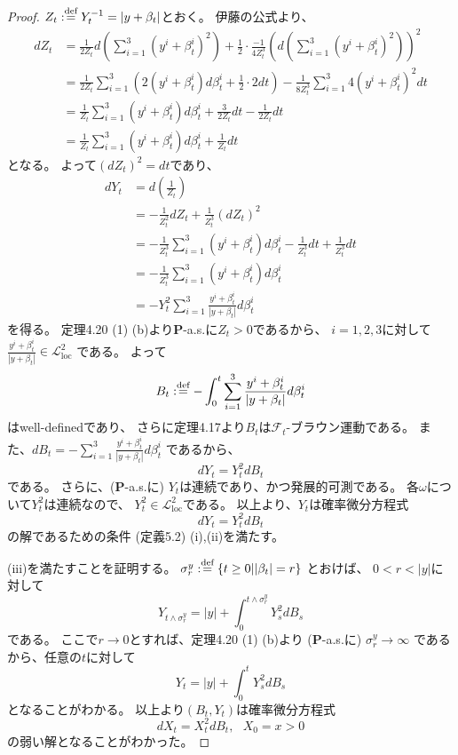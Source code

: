 \documentclass[uplatex]{jsarticle}
\theoremstyle{definition}
\def\P{\mathbf{P}}
\def\mcF{\mathcal{F}}
\def\mcL{\mathcal{L}}
\def\dfn{:\overset{\mbox{{\scriptsize def}}}{=}}
\begin{document}
\begin{proof}
  \(Z_t \dfn Y_t^{-1} = |y + \beta_t|\)とおく。
  伊藤の公式より、
  \begin{align*}
    dZ_t
    &= \frac{1}{2Z_t}d\left( \sum_{i=1}^3(y^i + \beta_t^i)^2 \right)
    + \frac{1}{2}\cdot \frac{-1}{4Z_t^3}
    \left( d\left( \sum_{i=1}^3(y^i + \beta_t^i)^2 \right) \right)^2 \\
    &= \frac{1}{2Z_t}\sum_{i=1}^3\left(
    2(y^i+\beta_t^i)d\beta_t^i + \frac{1}{2}\cdot 2dt\right)
    - \frac{1}{8Z_t^3}\sum_{i=1}^3 4(y^i+\beta_t^i)^2 dt \\
    &= \frac{1}{Z_t}\sum_{i=1}^3(y^i+\beta_t^i)d\beta_t^i
    + \frac{3}{2Z_t} dt - \frac{1}{2Z_t} dt \\
    &= \frac{1}{Z_t}\sum_{i=1}^3(y^i+\beta_t^i)d\beta_t^i
    + \frac{1}{Z_t} dt
  \end{align*}
  となる。
  よって\((dZ_t)^2 = dt\)であり、
  \begin{align*}
    dY_t
    &= d\left( \frac{1}{Z_t}\right) \\
    &= -\frac{1}{Z_t^2}dZ_t + \frac{1}{Z_t^3}(dZ_t)^2 \\
    &= -\frac{1}{Z_t^3}\sum_{i=1}^3(y^i+\beta_t^i)d\beta_t^i
    - \frac{1}{Z_t^3}dt + \frac{1}{Z_t^3}dt \\
    &= -\frac{1}{Z_t^3}\sum_{i=1}^3(y^i+\beta_t^i)d\beta_t^i \\
    &= - Y_t^2 \sum_{i=1}^3\frac{y^i+\beta_t^i}{|y+\beta_t|} d\beta_t^i
  \end{align*}
  を得る。
  定理4.20 (1) (b)より\(\P\)-a.s.に\(Z_t > 0\)であるから、
  \(i=1,2,3\)に対して
  \(\frac{y^i+\beta_t^i}{|y+\beta_t|} \in \mcL_{\mathrm{loc}}^2\)
  である。
  よって
  \[
  B_t \dfn -\int_0^t \sum_{i=1}^3 \frac{y^i+\beta_t^i}{|y+\beta_t|} d \beta_t^i
  \]
  はwell-definedであり、
  さらに定理4.17より\(B_t\)は\(\mcF_t\)-ブラウン運動である。
  また、\(dB_t = -\sum_{i=1}^3 \frac{y^i+\beta_t^i}{|y+\beta_t|} d \beta_t^i\)
  であるから、
  \[
  dY_t = Y_t^2 dB_t
  \]
  である。
  さらに、(\(\P\)-a.s.に) \(Y_t\)は連続であり、かつ発展的可測である。
  各\(\omega\)について\(Y_t^2\)は連続なので、
  \(Y_t^2\in \mcL_{\mathrm{loc}}^2\)である。
  以上より、\(Y_t\)は確率微分方程式
  \[
  dY_t = Y_t^2dB_t
  \]
  の解であるための条件 (定義5.2) (i),(ii)を満たす。

  (iii)を満たすことを証明する。
  \(\sigma_r^y \dfn \left\{ t \geq 0 \middle| |\beta_t| = r\right\}\)
  とおけば、
  \(0 < r < |y|\)に対して
  \[
  Y_{t\wedge\sigma_r^y}
  = |y| + \int_0^{t\wedge\sigma_r^y}Y_s^2 dB_s
  \]
  である。
  ここで\(r\to 0\)とすれば、定理4.20 (1) (b)より
  (\(\P\)-a.s.に) \(\sigma_r^y \to \infty\)
  であるから、任意の\(t\)に対して
  \[
  Y_t = |y| + \int_0^t Y_s^2 dB_s
  \]
  となることがわかる。
  以上より\((B_t,Y_t)\)は確率微分方程式
  \[
  dX_t = X_t^2 dB_t, \ \ \ X_0 = x > 0
  \]
  の弱い解となることがわかった。
\end{proof}
\end{document}
